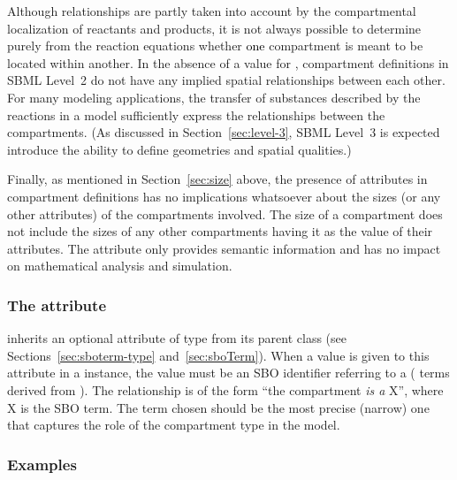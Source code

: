 Although  relationships are partly taken into account
by the compartmental localization of reactants and products, it is
not always possible to determine purely from the reaction
equations whether \textcolor{black}{one} compartment is meant to be located within
another.  In the absence of a value for ,
compartment definitions in SBML Level~2 do not have any implied
spatial relationships between each other.  For many modeling
applications, the transfer of substances described by the
reactions in a model sufficiently express the relationships
between the compartments.  (As discussed in
Section~\ref{sec:level-3}, SBML Level~3 is expected introduce the
ability to define geometries and spatial qualities.)

\begin{blockChanged}

Finally, as mentioned in Section~\ref{sec:size} above, the
presence of  attributes in compartment definitions
has no implications whatsoever about the sizes (or any other
attributes) of the compartments involved.  The size of a
compartment does not include the sizes of any other compartments
having it as the value of their  attributes.  The
 attribute only provides semantic information and
has no impact on mathematical analysis and simulation.

\end{blockChanged}


\subsubsection{The  attribute}
\label{sec:compartment-sboterm}

\Compartment inherits an optional 
attribute of type  from its parent
class \SBase (see Sections~\ref{sec:sboterm-type}
and~\ref{sec:sboTerm}).  When a value is given to this
attribute in a \Compartment instance, the value must be
an SBO identifier referring to a  (\ie
terms derived from \sboparticipantphysical).  The relationship is
of the form ``the compartment \emph{is a} X'', where X is the SBO
term.  The term chosen should be the most precise (narrow) one
that captures the role of the compartment type in the model.


\subsubsection{Examples}

